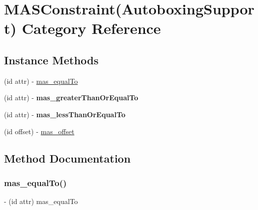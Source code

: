 \hypertarget{category_m_a_s_constraint_07_autoboxing_support_08}{}\section{M\+A\+S\+Constraint(Autoboxing\+Support) Category Reference}
\label{category_m_a_s_constraint_07_autoboxing_support_08}
\subsection*{Instance Methods}
\begin{DoxyCompactItemize}
\item 
(id attr) -\/ \mbox{\hyperlink{category_m_a_s_constraint_07_autoboxing_support_08_a3a362a9fa62f0adae01eb60b6a8508d1}{mas\+\_\+equal\+To}}
\item 
\mbox{\label{category_m_a_s_constraint_07_autoboxing_support_08_a847c1ec2da5932ca254650988d5be36a}} 
(id attr) -\/ {\bfseries mas\+\_\+greater\+Than\+Or\+Equal\+To}
\item 
\mbox{\label{category_m_a_s_constraint_07_autoboxing_support_08_aecd1a44827900ac4119b6b9c5c5f5eb0}} 
(id attr) -\/ {\bfseries mas\+\_\+less\+Than\+Or\+Equal\+To}
\item 
(id offset) -\/ \mbox{\hyperlink{category_m_a_s_constraint_07_autoboxing_support_08_aa1b8cf5bbeff5df1ab0d89fb95d31fe9}{mas\+\_\+offset}}
\end{DoxyCompactItemize}


\subsection{Method Documentation}
\mbox{\label{category_m_a_s_constraint_07_autoboxing_support_08_a3a362a9fa62f0adae01eb60b6a8508d1}} 
\subsubsection{\texorpdfstring{mas\+\_\+equal\+To()}{mas\_equalTo()}}
{\footnotesize\ttfamily -\/ (id attr) mas\+\_\+equal\+To \begin{DoxyParamCaption}{ }\end{DoxyParamCaption}}

